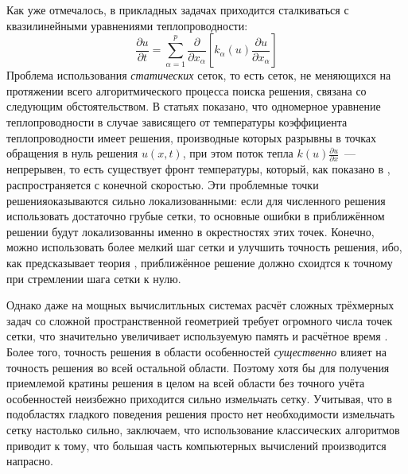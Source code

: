 Как уже отмечалось, в прикладных задачах приходится сталкиваться с квазилинейными уравнениями теплопроводности:
\begin{equation*}
    \frac{\partial u}{\partial t} =
    \sum\limits_{\alpha = 1}^{p} \frac{\partial }{\partial x_{\alpha}} \left[ 
        k_{\alpha}(u) \frac{\partial u}{\partial x_{\alpha}}
     \right]
\end{equation*}
Проблема использования \emph{статических} сеток, то есть сеток, не меняющихся на протяжении всего алгоритмического процесса поиска решения, связана со следующим обстоятельством.
В статьях \cite{ЗельдовичРазрывы, ЕщёРазрывы} показано, что одномерное уравнение теплопроводности в случае зависящего от температуры коэффициента теплопроводности имеет решения, производные которых разрывны в точках обращения в нуль решения $u(x, t)$, при этом поток тепла $k(u) \frac{\partial u}{\partial x}$~--- непрерывен, то есть существует фронт температуры, который, как показано в \cite{ЕщёЕщёРазрывы}, распространяется с конечной скоростью.
Эти \glqq проблемные точки решения\grqq оказываются сильно локализованными:
если для численного решения использовать достаточно грубые сетки, то основные ошибки в приближённом решении будут локализованны именно в окрестностях этих точек.
Конечно, можно использовать более мелкий шаг сетки и улучшить точность решения, ибо, как предсказывает теория \cite{СамарскийТеорияРазностныхСхем}, приближённое решение должно схоидтся к точному при стремлении шага сетки к нулю.

Однако даже на мощных вычислитльных системах расчёт сложных трёхмерных задач со сложной пространственной геометрией требует огромного числа точек сетки, что значительно увеличивает используемую память и расчётное время \cite{АфендиковЛАД}.
Более того, точность решения в области особенностей \emph{существенно} влияет на точность решения во всей остальной области.
Поэтому хотя бы для получения приемлемой кратины решения в целом на всей области без точного учёта особенностей неизбежно приходится сильно измельчать сетку.
Учитывая, что в подобластях гладкого поведения решения просто нет необходимости измельчать сетку настолько сильно, заключаем, что использование классических алгоритмов приводит к тому, что большая часть компьютерных вычислений производится напрасно.

